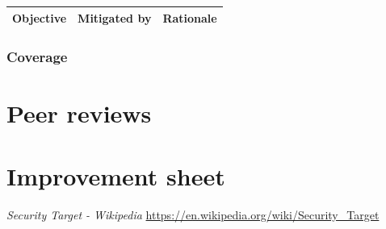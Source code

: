 \documentclass[10pt]{article}
\begin{document}
\begin{center}

	\begin{tabular}{| l | l | c |}
	  \hline
	  \textbf{Objective} & \textbf{Mitigated by} & \textbf{Rationale} \\
	  \hline
    
	\end{tabular}
	\end{center}

      \subsubsection{Coverage}
        

  \section{Peer reviews}

  \section{Improvement sheet}

  \begin{thebibliography}{9}
	 \textit{Security Target - Wikipedia} \url{https://en.wikipedia.org/wiki/Security_Target}
  \end{thebibliography}
\end{document}
